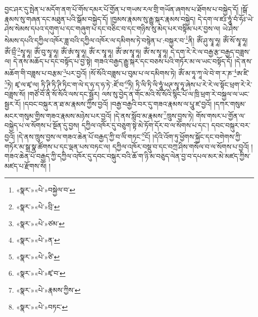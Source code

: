 བྱང་ཤར་དུ་སྤེན་པ་མདོག་ནག་པོ་གོས་དམར་པོ་གྱོན་པ་གཡས་རལ་གྲི་གཡོན་ཞགས་པ་ཐོགས་པ་བསྐྱེད་དོ། །སྒོ་རྣམས་སུ་གཞན་དང་མཐུན་པའི་སྒོམ་བསྐྱེད་དོ། །ཁྱམས་རྣམས་སུ་རྒྱུ་སྐར་རྣམས་བསྐྱེད། དེ་དག་ལ་ཛཿ་ཧཱུཾ་བཾ་ཧོཿ་ཡེ་ཤེས་སེམས་དཔའ་དགུག་པ་དང་གཞུག་པ་དང་བཅིང་བ་དང་གཉིས་སུ་མེད་པར་བསྟིམ་པར་བྱས་ལ། ཡེ་ཤེས་སེམས་དཔའི་དཀྱིལ་འཁོར་ཟླ་བའི་དཀྱིལ་འཁོར་ལ་དམིགས་ཏེ་བསྙེན་པ་:བསྐྱར་བ་\footnote{«སྣར་»«པེ་»བསྐྱེལ་བ་}ནི། ཨོཾ་ཤུ་སྭཱ་ཧཱ། ཨོཾ་སོ་སྭཱ་ཧཱ། ཨོཾ་བྲྀ་\footnote{«སྣར་»«པེ་»བྲི་}སྭཱ་ཧཱ། ཨོཾ་བུ་སྭཱ་ཧཱ། ཨོཾ་ཨཾ་སྭཱ་ཧཱ། ཨོཾ་ར་སྭཱ་ཧཱ། ཨོཾ་ཨ་སྭཱ་ཧཱ། ཨོཾ་ས་སྭཱ་ཧཱ། དེ་དག་རེ་རེ་ལ་བརྒྱ་རྩ་བརྒྱད་བཟླས་ལ། དེ་ནས་མཆོད་པ་དང་བསྟོད་པ་བྱ་སྟེ། གཟའ་བརྒྱད་རྒྱུ་སྐར་དང་བཅས་པའི་གཏོར་མ་ལ་ཡང་བསྟོད་དོ། །དེ་ནས་མཆོག་གི་བཟླས་པ་བརྩམ་\footnote{«སྣར་»«པེ་»ཙམ་}པར་བྱའོ། །སོ་སོའི་བཟླས་པ་བུམ་པ་ལ་དམིགས་ཏེ། ཨོཾ་མ་ཧཱ་ཀཱ་ལེ་བེ་ག་ར་ཎ་\footnote{«སྣར་»«པེ་»ན་}ཨ་ཛི་\footnote{«སྣར་»«པེ་»ཙི་}ཏེ། ཛྭ་ལ་ཛྭ་ལ། ཏི་ཊི་ཏི་ཊི་ཏིང་ག་ལེ་ད་ཧ་ད་ཧ་ཏེ་:ཛོ་བ་\footnote{«སྣར་»«པེ་»ཛྭ་བ་}ཏི། ཏི་ལི་ཏི་ལི་ཧཱུཾ་ཕཊ་སྭཱ་ཧཱ་ཞེས་པ་རེ་རེ་ལ་སྟོང་ཕྲག་རེ་རེ་བཟླས་སོ། །གཙོ་བོ་ནི་སོ་སོའི་ལས་དང་སྦྱོར། ལས་སུ་བྱེད་ན་གོང་མའི་སོ་སོའི་སྙིང་པོ་ལ་ཁྲི་ཕྲག་རེ་བསྐྱལ་ལ་ཡང་སྦྱར་རོ། །དབང་བསྐུར་ན་ཐ་མ་རྣམས་ཀྱིས་བྱའོ། །བརྒྱ་བརྒྱའི་བར་དུ་གཟའ་རྣམས་ལ་པཱུ་ཛ་བྱའོ། །དཀར་གསུམ་མངར་གསུམ་གྱིས་གཟའ་རྣམས་མཉེས་པར་བྱའོ། །དེ་ནས་སློབ་མ་རྣམས་\footnote{«སྣར་»«པེ་»རྣམས་ཀྱིས་}ཁྲུས་བྱས་ཏེ། གོས་གསར་པ་གྱོན་ལ་བསྐྱེད་པ་ལ་སོགས་པ་སྔོན་དུ་བྱས། དཀྱིལ་འཁོར་དུ་བཅུག་སྟེ་མེ་ཏོག་དོར་བ་ལ་སོགས་པ་དང་། དབང་བསྐུར་བར་བྱའོ། །དེ་ནས་ཁྲུས་བྱས་ལ་གཟའ་ཆེན་པོ་བརྒྱད་ཀྱི་བ་ལིཾ་གཏང་\footnote{«སྣར་»«པེ་»བཏང་}ངོ། །དེའི་འོག་ཏུ་ཕྱོགས་སྐྱོང་དང་བགེགས་ཀྱི་གཏོར་མ་སྒྲ་སྣ་ཚོགས་པ་དང་ལྡན་པས་བཏང་ལ། དཀྱིལ་འཁོར་བསྡུ་བ་དང་བཀྲ་ཤིས་གསོལ་བ་ལ་སོགས་པ་བྱའོ། །གཟའ་ཆེན་པོ་བརྒྱད་ཀྱི་དཀྱིལ་འཁོར་དུ་དབང་བསྐུར་བའི་ཆོ་ག་ཉི་མ་བཅུད་ལེན་བྱ་བ་དཔལ་མར་མེ་མཛད་ཀྱིས་མཛད་པ་རྫོགས་སོ། ། 
